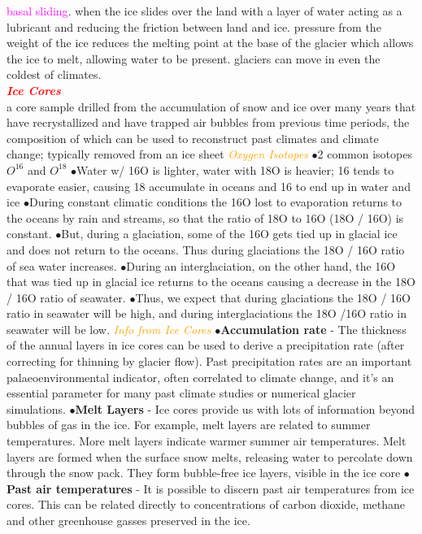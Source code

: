 \documentclass{article}
\newcommand{\ddd}{$\bullet$}
\newcommand{\red}[1]{\textcolor{red}{#1}}
\newcommand{\pink}[1]{\textcolor{magenta}{#1}}
\newcommand{\orange}[1]{\textcolor{orange}{#1}}
\newcommand{\mysection}[1]{\\ \textbf{\textit{\red{#1}}} \\}
\newcommand{\mysub}[1]{{\textit{\orange{#1}}}}
\newcommand{\vocab}[1]{{\pink{#1}}}
\begin{document}
\begin{multicols*}{4}
		\vocab{basal sliding}. when the ice slides over the land with a layer of water acting as a lubricant and reducing the friction between land and ice. pressure from the weight of the ice reduces the melting point at the base of the glacier which allows the ice to melt, allowing water to be present.  glaciers can move in even the coldest of climates.
        \mysection{Ice Cores} a core sample drilled from the accumulation of snow and ice over many years that have recrystallized and have trapped air bubbles from previous time periods, the composition of which can be used to reconstruct past climates and climate change; typically removed from an ice sheet
        \mysub{Oxygen Isotopes}
            \ddd 2 common isotopes $O^16$ and $O^18$
            \ddd Water w/ 16O is lighter, water with 18O is heavier; 16 tends to evaporate easier, causing 18 accumulate in oceans and 16 to end up in water and ice
            \ddd During constant climatic conditions the 16O lost to evaporation returns to the oceans by rain and streams, so that the ratio of 18O to 16O (18O / 16O) is constant.
            \ddd But, during a glaciation, some of the 16O gets tied up in glacial ice and does not return to the oceans. Thus during glaciations the 18O / 16O ratio of sea water increases.
            \ddd During an interglaciation, on the other hand, the 16O that was tied up in glacial ice returns to the oceans causing a decrease in the 18O / 16O ratio of seawater.
            \ddd Thus, we expect that during glaciations the 18O / 16O ratio in seawater will be high, and during interglaciations the 18O /16O ratio in seawater will be low.
        \mysub{Info from Ice Cores}
            \ddd \textbf{Accumulation rate} - The thickness of the annual layers in ice cores can be used to derive a precipitation rate (after correcting for thinning by glacier flow). Past precipitation rates are an important palaeoenvironmental indicator, often correlated to climate change, and it’s an essential parameter for many past climate studies or numerical glacier simulations.
            \ddd \textbf{Melt Layers} - Ice cores provide us with lots of information beyond bubbles of gas in the ice. For example, melt layers are related to summer temperatures. More melt layers indicate warmer summer air temperatures. Melt layers are formed when the surface snow melts, releasing water to percolate down through the snow pack. They form bubble-free ice layers, visible in the ice core
            \ddd \textbf{Past air temperatures} - It is possible to discern past air temperatures from ice cores. This can be related directly to concentrations of carbon dioxide, methane and other greenhouse gasses preserved in the ice.

\end{multicols*}
\end{document}
